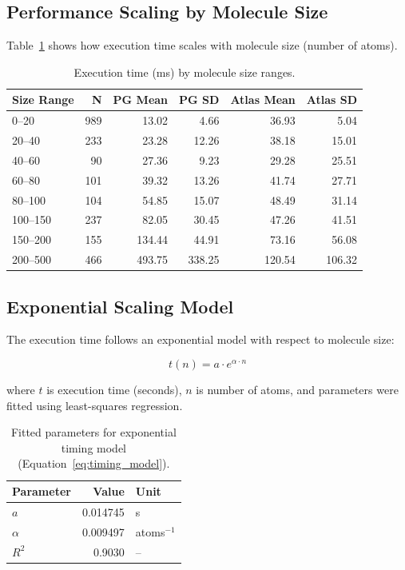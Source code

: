 \subsection*{Performance Scaling by Molecule Size}

Table~\ref{tab:timing_by_size} shows how execution time scales with molecule size (number of atoms).

\begin{table}[htbp]
\centering
\caption{Execution time (ms) by molecule size ranges.}
\label{tab:timing_by_size}
\begin{tabular}{lrrrrr}
\toprule
\rowcolor[HTML]{D6E4F5}\textbf{Size Range} & \textbf{N} & \textbf{PG Mean} & \textbf{PG SD} & \textbf{Atlas Mean} & \textbf{Atlas SD} \\
\midrule
\rowcolor[HTML]{FAEADE}0--20 & 989 & 13.02 & 4.66 & 36.93 & 5.04 \\
20--40 & 233 & 23.28 & 12.26 & 38.18 & 15.01 \\
\rowcolor[HTML]{FAEADE}40--60 & 90 & 27.36 & 9.23 & 29.28 & 25.51 \\
60--80 & 101 & 39.32 & 13.26 & 41.74 & 27.71 \\
\rowcolor[HTML]{FAEADE}80--100 & 104 & 54.85 & 15.07 & 48.49 & 31.14 \\
100--150 & 237 & 82.05 & 30.45 & 47.26 & 41.51 \\
\rowcolor[HTML]{FAEADE}150--200 & 155 & 134.44 & 44.91 & 73.16 & 56.08 \\
200--500 & 466 & 493.75 & 338.25 & 120.54 & 106.32 \\
\bottomrule
\end{tabular}
\end{table}

\subsection*{Exponential Scaling Model}

The execution time follows an exponential model with respect to molecule size:

\begin{equation}
t(n) = a \cdot e^{\alpha \cdot n}
\label{eq:timing_model}
\end{equation}

where $t$ is execution time (seconds), $n$ is number of atoms, and parameters were fitted using least-squares regression.

\begin{table}[htbp]
\centering
\caption{Fitted parameters for exponential timing model (Equation~\ref{eq:timing_model}).}
\label{tab:timing_model}
\begin{tabular}{lrl}
\toprule
\rowcolor[HTML]{D6E4F5}\textbf{Parameter} & \textbf{Value} & \textbf{Unit} \\
\midrule
$a$ & 0.014745 & s \\
$\alpha$ & 0.009497 & atoms$^{-1}$ \\
$R^2$ & 0.9030 & -- \\
\bottomrule
\end{tabular}
\end{table}

